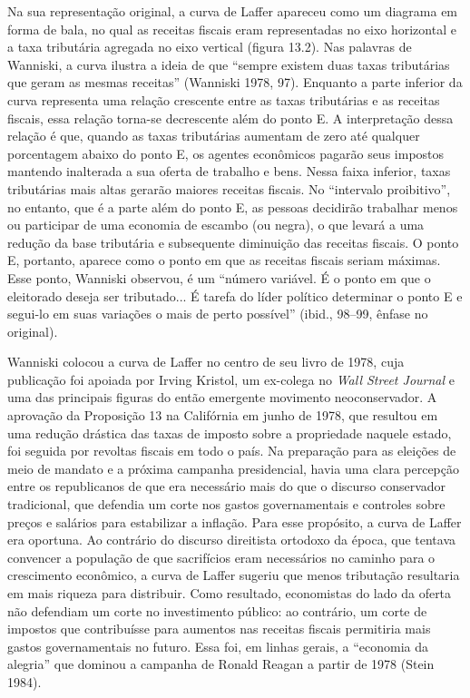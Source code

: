 \documentclass[a4paper,12pt]{article}[abntex2]
\begin{document}
Na sua representação original, a curva de Laffer apareceu como um diagrama em forma de bala, no qual as receitas fiscais eram representadas no eixo horizontal e a taxa tributária agregada no eixo vertical (figura 13.2). Nas palavras de Wanniski, a curva ilustra a ideia de que ``sempre existem duas taxas tributárias que geram as mesmas receitas'' (Wanniski 1978, 97). Enquanto a parte inferior da curva representa uma relação crescente entre as taxas tributárias e as receitas fiscais, essa relação torna-se decrescente além do ponto E. A interpretação dessa relação é que, quando as taxas tributárias aumentam de zero até qualquer porcentagem abaixo do ponto E, os agentes econômicos pagarão seus impostos mantendo inalterada a sua oferta de trabalho e bens. Nessa faixa inferior, taxas tributárias mais altas gerarão maiores receitas fiscais. No ``intervalo proibitivo'', no entanto, que é a parte além do ponto E, as pessoas decidirão trabalhar menos ou participar de uma economia de escambo (ou negra), o que levará a uma redução da base tributária e subsequente diminuição das receitas fiscais. O ponto E, portanto, aparece como o ponto em que as receitas fiscais seriam máximas. Esse ponto, Wanniski observou, é um ``número variável. É o ponto em que o eleitorado deseja ser tributado... É tarefa do líder político determinar o ponto E e segui-lo em suas variações o mais de perto possível'' (ibid., 98–99, ênfase no original).

Wanniski colocou a curva de Laffer no centro de seu livro de 1978, cuja publicação foi apoiada por Irving Kristol, um ex-colega no \textit{Wall Street Journal} e uma das principais figuras do então emergente movimento neoconservador. A aprovação da Proposição 13 na Califórnia em junho de 1978, que resultou em uma redução drástica das taxas de imposto sobre a propriedade naquele estado, foi seguida por revoltas fiscais em todo o país. Na preparação para as eleições de meio de mandato e a próxima campanha presidencial, havia uma clara percepção entre os republicanos de que era necessário mais do que o discurso conservador tradicional, que defendia um corte nos gastos governamentais e controles sobre preços e salários para estabilizar a inflação. Para esse propósito, a curva de Laffer era oportuna. Ao contrário do discurso direitista ortodoxo da época, que tentava convencer a população de que sacrifícios eram necessários no caminho para o crescimento econômico, a curva de Laffer sugeriu que menos tributação resultaria em mais riqueza para distribuir. Como resultado, economistas do lado da oferta não defendiam um corte no investimento público: ao contrário, um corte de impostos que contribuísse para aumentos nas receitas fiscais permitiria mais gastos governamentais no futuro. Essa foi, em linhas gerais, a ``economia da alegria'' que dominou a campanha de Ronald Reagan a partir de 1978 (Stein 1984).
\end{document}
